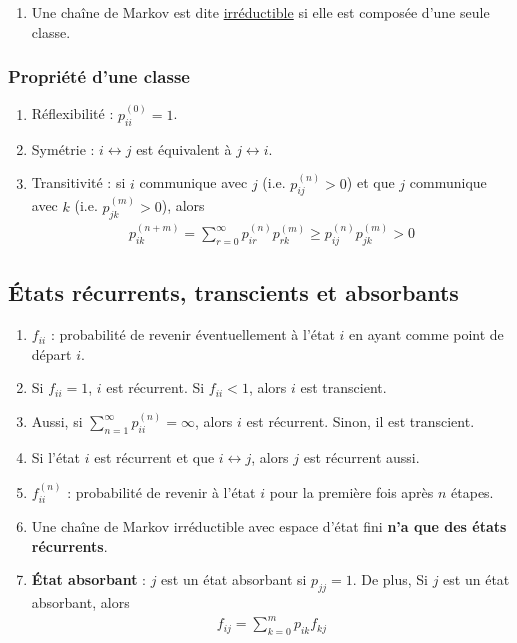 \documentclass[10pt, french, landscape]{article}
\begin{document}
\begin{multicols*}{3}
\begin{enumerate}[label=\faAngleRight]
\item Une chaîne de Markov est dite \underline{irréductible} si elle est composée d'une seule classe.
\end{enumerate}

\subsubsection*{Propriété d'une classe}
\begin{enumerate}[label=\faCheck]
\item Réflexibilité : $p_{ii}^{(0)} = 1$.
\item Symétrie : $i \leftrightarrow j$ est équivalent à $j \leftrightarrow i$.
\item Transitivité : si $i$ communique avec $j$ (i.e. $p_{ij}^{(n)} >0$) et que $j$ communique avec $k$ (i.e. $p_{jk}^{(m)}>0$), alors
\begin{align*}
p_{ik}^{(n+m)} = \sum_{r=0}^{\infty} p_{ir}^{(n)} p_{rk}^{(m)} \geq p_{ij}^{(n)} p_{jk}^{(m)} > 0
\end{align*}
\end{enumerate}

\subsection*{États récurrents, transcients et absorbants}
\begin{enumerate}[label=\faAngleRight]
\item $f_{ii}$ : probabilité de revenir éventuellement à l'état $i$ en ayant comme point de départ $i$.
\item Si $f_{ii} = 1$, $i$ est récurrent. Si $f_{ii} < 1$, alors $i$ est transcient.
\item Aussi, si $\sum_{n=1}^{\infty} p_{ii}^{(n)} = \infty$, alors $i$ est récurrent. Sinon, il est transcient.
\item Si l'état $i$ est récurrent et que $i \leftrightarrow j$, alors $j$ est récurrent aussi.
\item $f_{ii}^{(n)}$ : probabilité de revenir à l'état $i$ pour la première fois après $n$ étapes.
\item Une chaîne de Markov irréductible avec espace d'état fini \textbf{n'a que des états récurrents}.
\item \textbf{État absorbant} : $j$ est un état absorbant si $p_{jj} = 1$. De plus, Si $j$ est un état absorbant, alors
\begin{align*}
f_{ij} = \sum_{k=0}^{m} p_{ik} f_{kj}
\end{align*}
\end{enumerate}


\end{multicols*}
\end{document}
